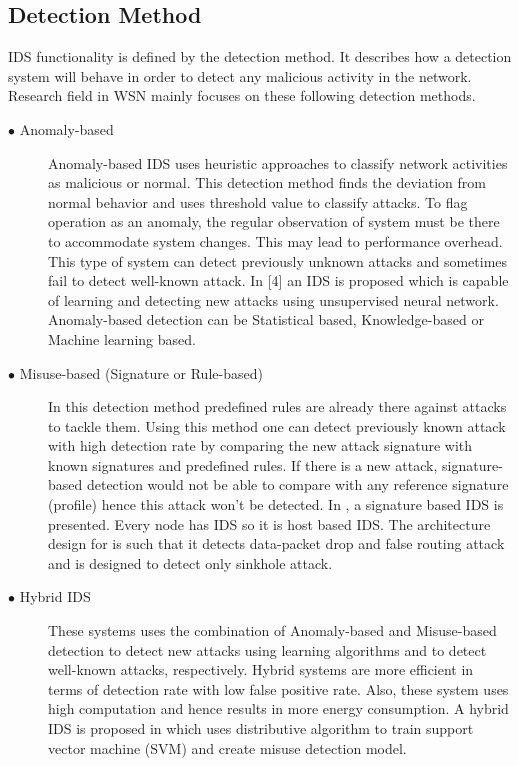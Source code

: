 \subsection{Detection Method}
IDS functionality is defined by the detection method. It describes how a detection system will behave in order to detect any malicious activity in the network. Research field in WSN mainly focuses on these following detection methods.
\begin{description}
  \item[$\bullet$ Anomaly-based] Anomaly-based IDS uses heuristic approaches to classify network activities as malicious or normal. This detection method finds the deviation from normal behavior and uses threshold value to classify attacks. To flag operation as an anomaly, the regular observation of system must be there to accommodate system changes. This may lead to performance overhead. This type of system can detect previously unknown attacks and sometimes fail to detect well-known attack. In [4] an IDS is proposed which is capable of learning and detecting new attacks using unsupervised neural network. Anomaly-based detection can be Statistical based, Knowledge-based or Machine learning based.
  \item[$\bullet$ Misuse-based (Signature or Rule-based)] In this detection method predefined rules are already there against attacks to tackle them. Using this method one can detect previously known attack with high detection rate by comparing the new attack signature with known signatures and predefined rules. If there is a new attack, signature-based detection would not be able to compare with any reference signature (profile) hence this attack won’t be detected. In \cite{ioannis2007towards, krontiris2007intrusion}, a signature based IDS is presented. Every node has IDS so it is host based IDS. The architecture design for \cite{ioannis2007towards} is such that it detects data-packet drop and false routing attack and \cite{krontiris2007intrusion} is designed to detect only sinkhole attack.
  \item[$\bullet$ Hybrid IDS] These systems uses the combination of Anomaly-based and Misuse-based detection to detect new attacks using learning algorithms and  to detect well-known attacks, respectively. Hybrid systems are more efficient in terms of detection rate with low false positive rate. Also, these system uses high computation and hence results in more energy consumption. A hybrid IDS is proposed in \cite{li2008intruder} which uses distributive algorithm to train support vector machine (SVM) and create misuse detection model.
\end{description}
